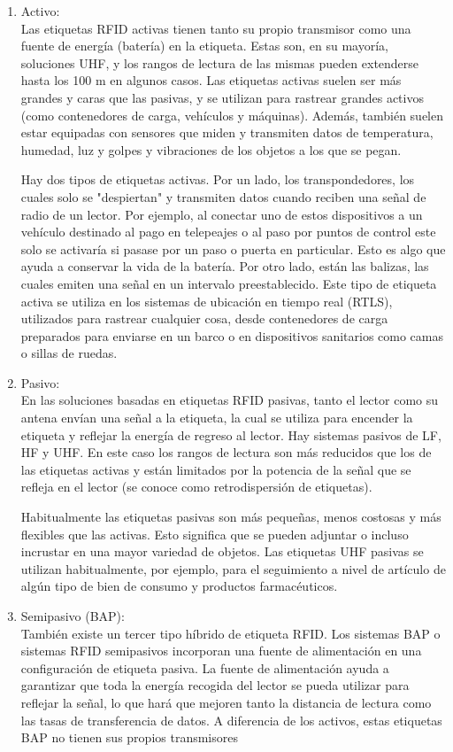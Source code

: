 \documentclass[12pt,a4paper,onecolumn,oneside]{report}
\begin{document}
\begin{enumerate}

\item Activo:\\
Las etiquetas RFID activas tienen tanto su propio transmisor como una fuente de energía (batería) en la etiqueta. Estas son, en su mayoría, soluciones UHF, y los rangos de lectura de las mismas pueden extenderse hasta los 100 m en algunos casos. Las etiquetas activas suelen ser más grandes y caras que las pasivas, y se utilizan para rastrear grandes activos (como contenedores de carga, vehículos y máquinas). Además, también suelen estar equipadas con sensores que miden y transmiten datos de temperatura, humedad, luz y golpes y vibraciones de los objetos a los que se pegan.

Hay dos tipos de etiquetas activas. Por un lado, los transpondedores, los cuales solo se "despiertan" y transmiten datos cuando reciben una señal de radio de un lector. Por ejemplo, al conectar uno de estos dispositivos a un vehículo destinado al pago en telepeajes o al paso por puntos de control este solo se activaría si pasase por un paso o puerta en particular. Esto es algo que ayuda a conservar la vida de la batería. Por otro lado, están las balizas, las cuales emiten una señal en un intervalo preestablecido. Este tipo de etiqueta activa se utiliza en los sistemas de ubicación en tiempo real (RTLS), utilizados para rastrear cualquier cosa, desde contenedores de carga preparados para enviarse en un barco o en dispositivos sanitarios como camas o sillas de ruedas.

\item Pasivo:\\
En las soluciones basadas en etiquetas RFID pasivas, tanto el lector como su antena envían una señal a la etiqueta, la cual se utiliza para encender la etiqueta y reflejar la energía de regreso al lector. Hay sistemas pasivos de LF, HF y UHF. En este caso los rangos de lectura son más reducidos que los de las etiquetas activas y están limitados por la potencia de la señal que se refleja en el lector (se conoce como retrodispersión de etiquetas).

Habitualmente las etiquetas pasivas son más pequeñas, menos costosas y más flexibles que las activas. Esto significa que se pueden adjuntar o incluso incrustar en una mayor variedad de objetos. Las etiquetas UHF pasivas se utilizan habitualmente, por ejemplo, para el seguimiento a nivel de artículo de algún tipo de bien de consumo y productos farmacéuticos.

\item Semipasivo (BAP):\\
También existe un tercer tipo híbrido de etiqueta RFID. Los sistemas BAP o sistemas RFID semipasivos incorporan una fuente de alimentación en una configuración de etiqueta pasiva. La fuente de alimentación ayuda a garantizar que toda la energía recogida del lector se pueda utilizar para reflejar la señal, lo que hará que mejoren tanto la distancia de lectura como las tasas de transferencia de datos. A diferencia de los activos, estas etiquetas BAP no tienen sus propios transmisores

\end{enumerate}
\end{document}
